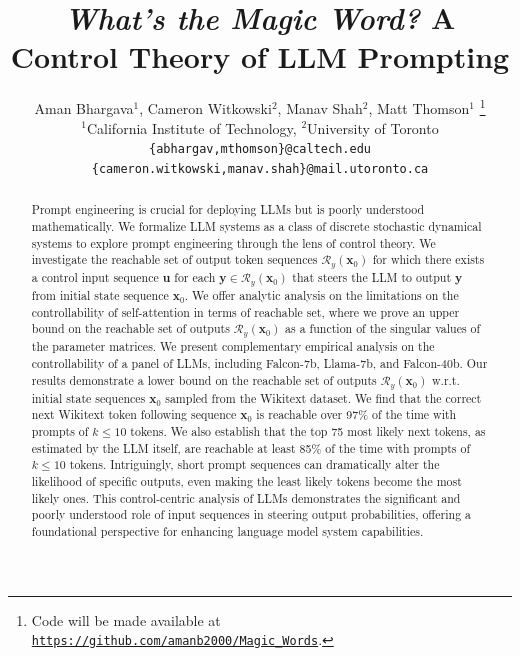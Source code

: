 \documentclass{article} %
\title{\textit{What's the Magic Word?} A Control Theory of LLM Prompting}
\author{Aman Bhargava$^1$, Cameron Witkowski$^2$, Manav Shah$^2$, Matt Thomson$^1$ 
\thanks{Code will be made available at \texttt{\href{https://github.com/amanb2000/Magic_Words}{https://github.com/amanb2000/Magic\_Words}}.} 
\\
$^1$California Institute of Technology, $^2$University of Toronto \\
\texttt{\{abhargav,mthomson\}@caltech.edu} \\
\texttt{\{cameron.witkowski,manav.shah\}@mail.utoronto.ca} \\ 
}
\begin{document}
\maketitle

\begin{abstract}
Prompt engineering is crucial for deploying LLMs but is poorly understood mathematically. We formalize LLM systems as a class of discrete stochastic dynamical systems to explore prompt engineering through the lens of control theory. We investigate the reachable set of output token sequences $\mathcal R_y(\mathbf x_0)$ for which there exists a control input sequence $\mathbf u$ for each $\mathbf y \in \mathcal R_y(\mathbf x_0)$ that steers the LLM to output $\mathbf y$ from initial state sequence $\mathbf x_0$.
We offer analytic analysis on the limitations on the controllability of self-attention in terms of reachable set, where we prove an upper bound on the reachable set of outputs $\mathcal R_y(\mathbf x_0)$ as a function of the singular values of the parameter matrices.
We present complementary empirical analysis on the controllability of a panel of LLMs, including Falcon-7b, Llama-7b, and Falcon-40b. 
Our results demonstrate a lower bound on the reachable set of outputs $\mathcal R_y(\mathbf x_0)$ w.r.t. initial state sequences $\mathbf x_0$ sampled from the Wikitext dataset.
We find that the correct next Wikitext token following sequence $\mathbf x_0$ is reachable over 97\% of the time with prompts of $k\leq 10$ tokens. 
We also establish that the top 75 most likely next tokens, as estimated by the LLM itself, are reachable at least 85\% of the time with prompts of $k\leq 10$ tokens. 
Intriguingly, short prompt sequences can dramatically alter the likelihood of specific outputs, even making the least likely tokens become the most likely ones. 
This control-centric analysis of LLMs demonstrates the significant and poorly understood role of input sequences in steering output probabilities, offering a foundational perspective for enhancing language model system capabilities.
\end{abstract}
\end{document}
